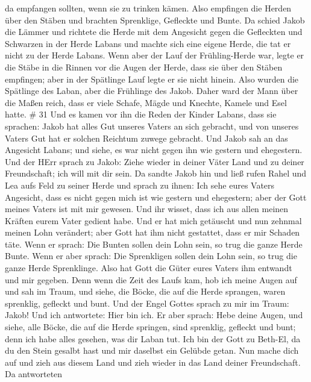 da empfangen sollten, wenn sie zu trinken kämen.  Also
empfingen die Herden über den Stäben und brachten Sprenklige, Gefleckte
und Bunte.  Da schied Jakob die Lämmer und richtete die
Herde mit dem Angesicht gegen die Gefleckten und Schwarzen in der Herde
Labans und machte sich eine eigene Herde, die tat er nicht zu der Herde
Labans.  Wenn aber der Lauf der Frühling-Herde war, legte
er die Stäbe in die Rinnen vor die Augen der Herde, dass sie über den
Stäben empfingen;  aber in der Spätlinge Lauf legte er sie
nicht hinein. Also wurden die Spätlinge des Laban, aber die Frühlinge
des Jakob.  Daher ward der Mann über die Maßen reich, dass
er viele Schafe, Mägde und Knechte, Kamele und Esel hatte. \# 31
 Und es kamen vor ihn die Reden der Kinder Labans, dass sie
sprachen: Jakob hat alles Gut unseres Vaters an sich gebracht, und von
unseres Vaters Gut hat er solchen Reichtum zuwege gebracht. 
Und Jakob sah an das Angesicht Labans; und siehe, es war nicht gegen ihn
wie gestern und ehegestern.  Und der HErr sprach zu Jakob:
Ziehe wieder in deiner Väter Land und zu deiner Freundschaft; ich will
mit dir sein.  Da sandte Jakob hin und ließ rufen Rahel und
Lea aufs Feld zu seiner Herde  und sprach zu ihnen: Ich sehe
eures Vaters Angesicht, dass es nicht gegen mich ist wie gestern und
ehegestern; aber der Gott meines Vaters ist mit mir gewesen.
 Und ihr wisset, dass ich aus allen meinen Kräften eurem
Vater gedient habe.  Und er hat mich getäuscht und nun
zehnmal meinen Lohn verändert; aber Gott hat ihm nicht gestattet, dass
er mir Schaden täte.  Wenn er sprach: Die Bunten sollen dein
Lohn sein, so trug die ganze Herde Bunte. Wenn er aber sprach: Die
Sprenkligen sollen dein Lohn sein, so trug die ganze Herde Sprenklinge.
 Also hat Gott die Güter eures Vaters ihm entwandt und mir
gegeben.  Denn wenn die Zeit des Laufs kam, hob ich meine
Augen auf und sah im Traum, und siehe, die Böcke, die auf die Herde
sprangen, waren sprenklig, gefleckt und bunt.  Und der
Engel Gottes sprach zu mir im Traum: Jakob! Und ich antwortete: Hier bin
ich.  Er aber sprach: Hebe deine Augen, und siehe, alle
Böcke, die auf die Herde springen, sind sprenklig, gefleckt und bunt;
denn ich habe alles gesehen, was dir Laban tut.  Ich bin
der Gott zu Beth-El, da du den Stein gesalbt hast und mir daselbst ein
Gelübde getan. Nun mache dich auf und zieh aus diesem Land und zieh
wieder in das Land deiner Freundschaft.  Da antworteten
